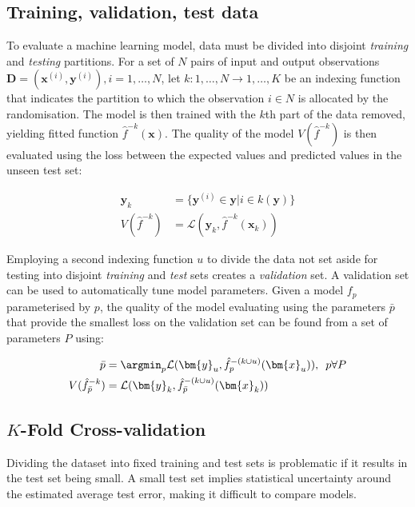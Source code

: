 \subsection{Training, validation, test data}

To evaluate a machine learning model, data must be divided into disjoint \emph{training} and \emph{testing} partitions. For a set of $N$ pairs of input and output observations $\bm{D} = (\bm{x}^{(i)}, \bm{y}^{(i)}), i = 1, \ldots, N$, let $k : {1,\ldots,N} \rightarrow {1,\ldots,K}$ be an indexing function that indicates the partition to which the observation $i \in N$ is allocated by the randomisation. The model is then trained with the $k$th part of the data removed, yielding fitted function $\hat{f}^{-k}(\bm{x})$. The quality of the model $V(\hat{f}^{-k})$ is then evaluated using the loss between the expected values and predicted values in the unseen test set:

\begin{align}
  \bm{y}_k &= \{ \bm{y}^{(i)} \in \bm{y} | i \in k(\bm{y}) \} \\
  V(\hat{f}^{-k}) &= \mathcal{L}(\bm{y}_k, \hat{f}^{-k}(\bm{x}_k))
\end{align}

Employing a second indexing function $u$ to divide the data not set aside for testing into disjoint \emph{training} and \emph{test} sets creates a \emph{validation} set. A validation set can be used to automatically tune model parameters. Given a model $f_p$ parameterised by $p$, the quality of the model evaluating using the parameters $\bar{p}$ that provide the smallest loss on the validation set can be found from a set of parameters $P$ using:

\begin{align}
  \bar{p} &= \argmin_p \mathcal{L}(\bm{y}_u, \hat{f}_p^{-(k \cup u)}(\bm{x}_u)), \hspace{.5em} p \forall P\\
  V(\hat{f}_{\bar{p}}^{-k}) &= \mathcal{L}(\bm{y}_k, \hat{f}_{\bar{p}}^{-(k \cup u)}(\bm{x}_k))
\end{align}

\subsection{$K$-Fold Cross-validation}

Dividing the dataset into fixed training and test sets is problematic if it results in the test set being small. A small test set implies statistical uncertainty around the estimated average test error, making it difficult to compare models.

